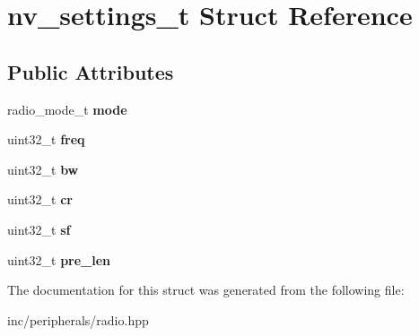 \hypertarget{structnv__settings__t}{}\section{nv\+\_\+settings\+\_\+t Struct Reference}
\label{structnv__settings__t}
\subsection*{Public Attributes}
\begin{DoxyCompactItemize}
\item 
\mbox{\label{structnv__settings__t_a07e36e9e38797e22ac009ff74fc7e655}} 
radio\+\_\+mode\+\_\+t {\bfseries mode}
\item 
\mbox{\label{structnv__settings__t_a1ec8a5248f1de3ab3309048bcba83129}} 
uint32\+\_\+t {\bfseries freq}
\item 
\mbox{\label{structnv__settings__t_ae9d37787c2337c3edc8730c4abe32016}} 
uint32\+\_\+t {\bfseries bw}
\item 
\mbox{\label{structnv__settings__t_aa7c1cc948fa389ad37d442ea36838b9b}} 
uint32\+\_\+t {\bfseries cr}
\item 
\mbox{\label{structnv__settings__t_ad4c1338cfba521562bc39d8857c56bd7}} 
uint32\+\_\+t {\bfseries sf}
\item 
\mbox{\label{structnv__settings__t_a24a3db5600c65a5ed07da5c1ca69b786}} 
uint32\+\_\+t {\bfseries pre\+\_\+len}
\end{DoxyCompactItemize}


The documentation for this struct was generated from the following file\+:\begin{DoxyCompactItemize}
\item 
inc/peripherals/radio.\+hpp\end{DoxyCompactItemize}
